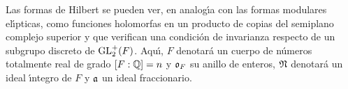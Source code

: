 Las formas de Hilbert se pueden ver, en analog\'{\i}a con las formas
modulares el\'{\i}pticas, como funciones holomorfas en un producto de
copias del semiplano complejo superior y que verifican una condici\'{o}n
de invarianza respecto de un subgrupo discreto de $\GLtp_{2}(F)$.
Aqu\'{\i}, $F$ denotar\'{a} un cuerpo de n\'{u}meros totalmente real de grado
$[F:\bb{Q}]=n$ y $\oka{F}$ su anillo de enteros, $\frak{N}$ denotar\'{a} un
ideal \'{\i}ntegro de $F$ y $\frak{a}$ un ideal fraccionario.
%
